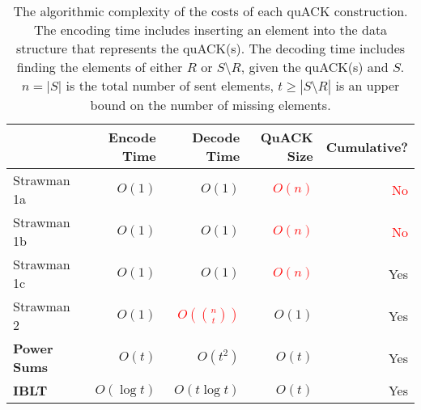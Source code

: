 \begin{table}[t]
\centering
\begin{tabular}{lrrrr}
  \toprule
  & \bf Encode Time & \bf Decode Time & \bf QuACK Size & \bf Cumulative?\\
  \midrule
  Strawman 1a & $O(1)$ & $O(1)$ & \textcolor{red}{$O(n)$} & \textcolor{red}{No} \\
  Strawman 1b & $O(1)$ & $O(1)$ & \textcolor{red}{$O(n)$} & \textcolor{red}{No} \\
  Strawman 1c & $O(1)$ & $O(1)$ & \textcolor{red}{$O(n)$} & Yes \\
  Strawman 2 & $O(1)$ & \textcolor{red}{$O(\binom{n}{t})$} & $O(1)$ & Yes \\
  \rowcolor{yellow}
  \bf Power Sums & $O(t)$ & $O(t^2)$ & $O(t)$ & Yes \\
  \rowcolor{yellow}
  \bf IBLT & $O(\log t)$ & $O(t\log t)$ & $O(t)$ & Yes \\
  \bottomrule
\end{tabular}
\caption{The algorithmic complexity of the costs of each quACK construction.
The encoding time includes inserting an element into the data structure that
represents the quACK(s). The decoding time
 includes finding the elements of either $R$ or $S \setminus R$,
 given the quACK(s) and $S$.
$n = |S|$ is the total number of sent elements, $t \geq |S \setminus R|$ is an
upper bound on the number of missing elements.%
}
\label{tab:quack:theoretical}
\end{table}
